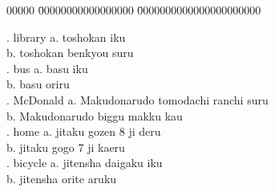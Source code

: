 \documentclass[uplatex,dvipdfmx,b5paper,english,10pt]{jsbook}
\begin{document}
\ifEnglish
\begin{tabbing}
00000 \= 00000000000000000 \= 0000000000000000000000 \kill

. library \>
a. toshokan \underline{\hspace{2em}} iku   \\
\> \>
b. toshokan \underline{\hspace{2em}} benkyou suru\\

. bus \>
a. basu \underline{\hspace{2em}} iku   \\
\> \>
b. basu \underline{\hspace{2em}} oriru \\

. McDonald \>
a. Makudonarudo \underline{\hspace{2em}} tomodachi \underline{\hspace{2em}} ranchi suru \\
\> \>
b. Makudonarudo \underline{\hspace{2em}} biggu makku \underline{\hspace{2em}} kau \\

. home \>
a. jitaku \underline{\hspace{2em}} gozen 8 ji \underline{\hspace{2em}} deru \\
\> \>
b. jitaku \underline{\hspace{2em}} gogo 7 ji \underline{\hspace{2em}} kaeru \\

. bicycle \>
a. jitensha \underline{\hspace{2em}} daigaku \underline{\hspace{2em}} iku \\
\> \>
b. jitensha \underline{\hspace{2em}} orite aruku \\

\end{tabbing}
\else
\end{document}

